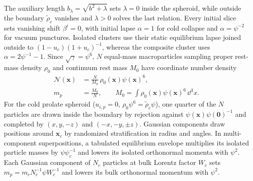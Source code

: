 The auxiliary length $b_\lambda=\sqrt{b^2+\lambda}$ sets $\lambda=0$ inside the spheroid, while outside the boundary $\tilde{\rho}_c$ vanishes and $\lambda>0$ solves the last relation. Every initial slice sets vanishing shift $\beta^i=0$, with initial lapse $\alpha=1$ for cold collapse and $\alpha=\psi^{-2}$ for vacuum punctures. Isolated clusters use their static equilibrium lapse joined outside to $(1-u_c)(1+u_c)^{-1}$, whereas the composite cluster uses $\alpha=2\psi^{-1}-1$. Since $\sqrt{\gamma}=\psi^6$, $N$ equal-mass macroparticles sampling proper rest-mass density $\rho_0$ and continuum rest mass $M_0$ have coordinate number density
\begin{align}\label{eq:app_coord_density}
\mathcal{N}(\bm{x})&=\frac{N}{M_0}\,\rho_0(\bm{x})\psi(\bm{x})^6,\nonumber\\
m_p&=\frac{M_0}{N},\qquad M_0=\int\rho_0(\bm{x})\psi(\bm{x})^6\,\dd^3x.
\end{align}
For the cold prolate spheroid ($u_{i,p}=0$, $\rho_0\psi^6=\tilde{\rho}_c\psi$), one quarter of the $N$ particles are drawn inside the boundary by rejection against $\psi(\bm{x})\psi(\bm{0})^{-1}$ and completed by $(x,y,-z)$ and $(-x,-y,\pm z)$. Gaussian components draw positions around $\bm{x}_c$ by randomized stratification in radius and angles. In multi-component superpositions, a tabulated equilibrium envelope multiplies its isolated particle masses by $\psi\psi_c^{-1}$ and lowers its isolated orthonormal momenta with $\psi^2$. Each Gaussian component of $N_c$ particles at bulk Lorentz factor $W_c$ sets $m_p=m_c N_c^{-1}\psi W_c^{-1}$ and lowers its bulk orthonormal momentum with $\psi^2$.

